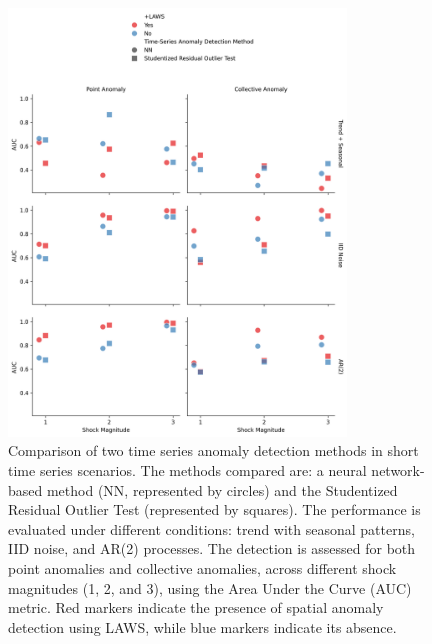 \documentclass[11pt]{article}
\begin{document}
\begin{figure}[h]
    \centering
    \includegraphics[width=0.8\textwidth]{../figure/simulation_short_time_series.png}
    \caption{Comparison of two time series anomaly detection methods in short time series scenarios. The methods compared are: a neural network-based method (NN, represented by circles) and the Studentized Residual Outlier Test (represented by squares). The performance is evaluated under different conditions: trend with seasonal patterns, IID noise, and AR(2) processes. The detection is assessed for both point anomalies and collective anomalies, across different shock magnitudes (1, 2, and 3), using the Area Under the Curve (AUC) metric. Red markers indicate the presence of spatial anomaly detection using LAWS, while blue markers indicate its absence.}
    \label{fig: simulation short time series}
\end{figure}
\end{document}
